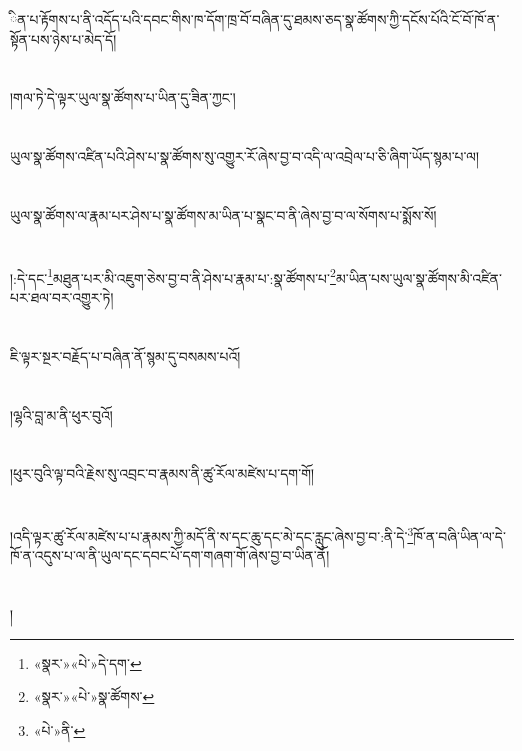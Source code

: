 ིན་པ་རྟོགས་པ་ནི་འདོད་པའི་དབང་གིས་ཁ་དོག་ཁྲ་བོ་བཞིན་དུ་ཐམས་ཅད་སྣ་ཚོགས་ཀྱི་དངོས་པོའི་ངོ་བོ་ཁོ་ན་སྟོན་པས་ཉེས་པ་མེད་དོ།\chapter{ }།གལ་ཏེ་དེ་ལྟར་ཡུལ་སྣ་ཚོགས་པ་ཡིན་དུ་ཟིན་ཀྱང་།\chapter{ }ཡུལ་སྣ་ཚོགས་འཛིན་པའི་ཤེས་པ་སྣ་ཚོགས་སུ་འགྱུར་རོ་ཞེས་བྱ་བ་འདི་ལ་འབྲེལ་པ་ཅི་ཞིག་ཡོད་སྙམ་པ་ལ།\chapter{ }ཡུལ་སྣ་ཚོགས་ལ་རྣམ་པར་ཤེས་པ་སྣ་ཚོགས་མ་ཡིན་པ་སྣང་བ་ནི་ཞེས་བྱ་བ་ལ་སོགས་པ་སྨོས་སོ།\chapter{ }།:དེ་དང་\footnote{«སྣར་»«པེ་»དེ་དག་}མཐུན་པར་མི་འཇུག་ཅེས་བྱ་བ་ནི་ཤེས་པ་རྣམ་པ་:སྣ་ཚོགས་པ་\footnote{«སྣར་»«པེ་»སྣ་ཚོགས་}མ་ཡིན་པས་ཡུལ་སྣ་ཚོགས་མི་འཛིན་པར་ཐལ་བར་འགྱུར་ཏེ།\chapter{ }ཇི་ལྟར་སྔར་བརྗོད་པ་བཞིན་ནོ་སྙམ་དུ་བསམས་པའོ།\chapter{ }།ལྷའི་བླ་མ་ནི་ཕུར་བུའོ།\chapter{ }།ཕུར་བུའི་ལྟ་བའི་རྗེས་སུ་འབྲང་བ་རྣམས་ནི་ཚུ་རོལ་མཛེས་པ་དག་གོ།\chapter{ }།འདི་ལྟར་ཚུ་རོལ་མཛེས་པ་པ་རྣམས་ཀྱི་མདོ་ནི་ས་དང་ཆུ་དང་མེ་དང་རླུང་ཞེས་བྱ་བ་:ནི་དེ་\footnote{«པེ་»ནི་}ཁོ་ན་བཞི་ཡིན་ལ་དེ་ཁོ་ན་འདུས་པ་ལ་ནི་ཡུལ་དང་དབང་པོ་དག་གཞག་གོ་ཞེས་བྱ་བ་ཡིན་ནོ།\chapter{ }།
